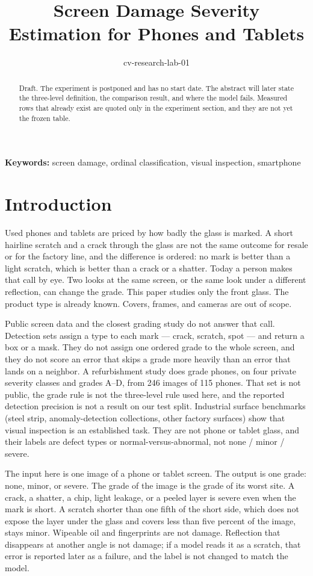 \documentclass[10pt]{article}
\title{Screen Damage Severity Estimation for Phones and Tablets}
\author{cv-research-lab-01}
\date{}
\begin{document}
\maketitle

\begin{abstract}
Draft. The experiment is postponed and has no start date. The abstract will later state the three-level definition, the comparison result, and where the model fails. Measured rows that already exist are quoted only in the experiment section, and they are not yet the frozen table.
\end{abstract}

\noindent\textbf{Keywords:} screen damage, ordinal classification, visual inspection, smartphone

\section{Introduction}
Used phones and tablets are priced by how badly the glass is marked. A short hairline scratch and a crack through the glass are not the same outcome for resale or for the factory line, and the difference is ordered: no mark is better than a light scratch, which is better than a crack or a shatter. Today a person makes that call by eye. Two looks at the same screen, or the same look under a different reflection, can change the grade. This paper studies only the front glass. The product type is already known. Covers, frames, and cameras are out of scope.

Public screen data and the closest grading study do not answer that call. Detection sets assign a type to each mark --- crack, scratch, spot --- and return a box or a mask. They do not assign one ordered grade to the whole screen, and they do not score an error that skips a grade more heavily than an error that lands on a neighbor. A refurbishment study does grade phones, on four private severity classes and grades A--D, from 246 images of 115 phones. That set is not public, the grade rule is not the three-level rule used here, and the reported detection precision is not a result on our test split. Industrial surface benchmarks (steel strip, anomaly-detection collections, other factory surfaces) show that visual inspection is an established task. They are not phone or tablet glass, and their labels are defect types or normal-versus-abnormal, not none / minor / severe.

The input here is one image of a phone or tablet screen. The output is one grade: none, minor, or severe. The grade of the image is the grade of its worst site. A crack, a shatter, a chip, light leakage, or a peeled layer is severe even when the mark is short. A scratch shorter than one fifth of the short side, which does not expose the layer under the glass and covers less than five percent of the image, stays minor. Wipeable oil and fingerprints are not damage. Reflection that disappears at another angle is not damage; if a model reads it as a scratch, that error is reported later as a failure, and the label is not changed to match the model.
\end{document}
